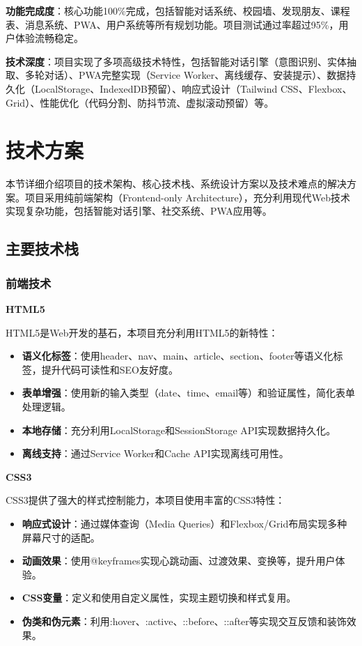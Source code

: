 \documentclass[12pt,a4paper]{article}
\begin{document}
\textbf{功能完成度}：核心功能100\%完成，包括智能对话系统、校园墙、发现朋友、课程表、消息系统、PWA、用户系统等所有规划功能。项目测试通过率超过95\%，用户体验流畅稳定。

\textbf{技术深度}：项目实现了多项高级技术特性，包括智能对话引擎（意图识别、实体抽取、多轮对话）、PWA完整实现（Service Worker、离线缓存、安装提示）、数据持久化（LocalStorage、IndexedDB预留）、响应式设计（Tailwind CSS、Flexbox、Grid）、性能优化（代码分割、防抖节流、虚拟滚动预留）等。

\section{技术方案}

本节详细介绍项目的技术架构、核心技术栈、系统设计方案以及技术难点的解决方案。项目采用纯前端架构（Frontend-only Architecture），充分利用现代Web技术实现复杂功能，包括智能对话引擎、社交系统、PWA应用等。

\subsection{主要技术栈}

\subsubsection{前端技术}

\textbf{HTML5}

HTML5是Web开发的基石，本项目充分利用HTML5的新特性：

\begin{itemize}
    \item \textbf{语义化标签}：使用header、nav、main、article、section、footer等语义化标签，提升代码可读性和SEO友好度。
    \item \textbf{表单增强}：使用新的输入类型（date、time、email等）和验证属性，简化表单处理逻辑。
    \item \textbf{本地存储}：充分利用LocalStorage和SessionStorage API实现数据持久化。
    \item \textbf{离线支持}：通过Service Worker和Cache API实现离线可用性。
\end{itemize}

\textbf{CSS3}

CSS3提供了强大的样式控制能力，本项目使用丰富的CSS3特性：

\begin{itemize}
    \item \textbf{响应式设计}：通过媒体查询（Media Queries）和Flexbox/Grid布局实现多种屏幕尺寸的适配。
    \item \textbf{动画效果}：使用@keyframes实现心跳动画、过渡效果、变换等，提升用户体验。
    \item \textbf{CSS变量}：定义和使用自定义属性，实现主题切换和样式复用。
    \item \textbf{伪类和伪元素}：利用:hover、:active、::before、::after等实现交互反馈和装饰效果。
\end{itemize}
\end{document}
